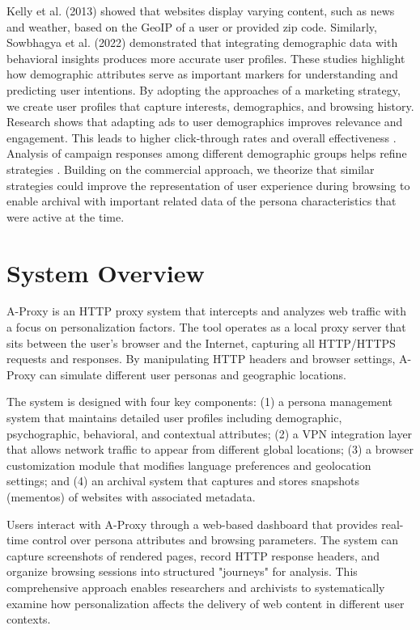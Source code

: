 \documentclass[sigconf]{acmart}
\begin{document}
Kelly et al. (2013) \cite{kelly2013method} showed that websites display varying content, such as news and weather, based on the GeoIP of a user or provided zip code. Similarly, Sowbhagya et al. (2022) \cite{hidri2024learning} demonstrated that integrating demographic data with behavioral insights produces more accurate user profiles. These studies highlight how demographic attributes serve as important markers for understanding and predicting user intentions. By adopting the approaches of a marketing strategy, we create user profiles that capture interests, demographics, and browsing history. Research shows that adapting ads to user demographics improves relevance and engagement. This leads to higher click-through rates and overall effectiveness \cite{de2015towards}. Analysis of campaign responses among different demographic groups helps refine strategies \cite{carrascosa2015always}. Building on the commercial approach, we theorize that similar strategies could improve the representation of user experience during browsing to enable archival with important related data of the persona characteristics that were active at the time.



\section{System Overview}
A-Proxy is an HTTP proxy system that intercepts and analyzes web traffic with a focus on personalization factors. The tool operates as a local proxy server that sits between the user's browser and the Internet, capturing all HTTP/HTTPS requests and responses. By manipulating HTTP headers and browser settings, A-Proxy can simulate different user personas and geographic locations.

The system is designed with four key components: (1) a persona management system that maintains detailed user profiles including demographic, psychographic, behavioral, and contextual attributes; (2) a VPN integration layer that allows network traffic to appear from different global locations; (3) a browser customization module that modifies language preferences and geolocation settings; and (4) an archival system that captures and stores snapshots (mementos) of websites with associated metadata.

Users interact with A-Proxy through a web-based dashboard that provides real-time control over persona attributes and browsing parameters. The system can capture screenshots of rendered pages, record HTTP response headers, and organize browsing sessions into structured "journeys" for analysis. This comprehensive approach enables researchers and archivists to systematically examine how personalization affects the delivery of web content in different user contexts.
\end{document}
